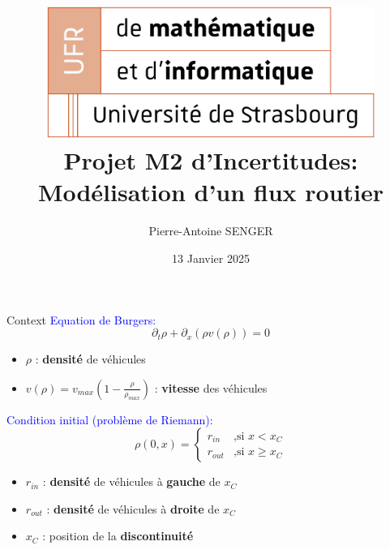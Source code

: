\documentclass[10pt]{beamer}
\title[Projet M2 Incertitudes]{
  \includegraphics[width=0.8\textwidth]{images/logo-ufr.png}\\
  Projet M2 d'Incertitudes:\\
Modélisation d'un flux routier}
\author[PA Senger]{Pierre-Antoine SENGER}
\date{13 Janvier 2025}
\begin{document}

\begin{frame}{}
  \titlepage
\end{frame}

\begin{frame}{Context}
  \textcolor{blue}{Equation de Burgers:}
  $$ \partial_t \rho + \partial_x (\rho v(\rho)) = 0 $$
  \begin{itemize}
    \item $\rho$ : \textbf{densité} de véhicules
    \item $v(\rho) = v_{max} (1 - \frac{\rho}{\rho_{max}})$ : \textbf{vitesse} des véhicules
  \end{itemize}

  \textcolor{blue}{Condition initial (problème de Riemann):}
  $$ \rho(0, x) =
  \begin{cases} r_{in} & \text{,si } x < x_C \\
    r_{out} & \text{,si } x \geq x_C
  \end{cases} $$
  \begin{itemize}
    \item $r_{in}$ : \textbf{densité} de véhicules à \textbf{gauche} de $x_C$
    \item $r_{out}$ : \textbf{densité} de véhicules à \textbf{droite} de $x_C$
    \item $x_C$ : position de la \textbf{discontinuité}
  \end{itemize}

\end{frame}
\end{document}
